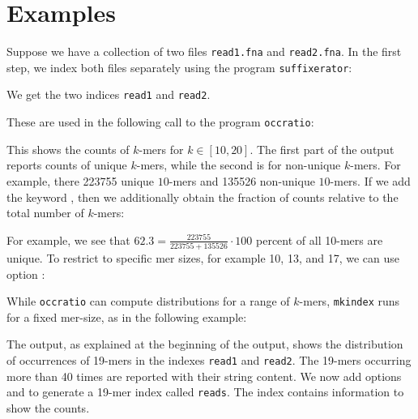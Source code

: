 \documentclass[12pt]{article}
\newcommand{\Programname}[1]{\texttt{\small #1}}
\newcommand{\TYmkindex}[0]{\Programname{mkindex}\xspace}
\newcommand{\TYoccratio}[0]{\Programname{occratio}\xspace}
\newcommand{\SFX}[0]{\Programname{suffixerator}\xspace}
\begin{document}
\section{Examples}

Suppose we have a collection of two files \texttt{read1.fna} and
\texttt{read2.fna}. In the first step, we index 
both files separately using the program \SFX:



We get the two indices \texttt{read1} and \texttt{read2}.

These are used in the following call to the program \TYoccratio:


This shows the counts of $k$-mers for $k\in[10,20]$. The first part of the
output reports counts of unique $k$-mers, while the second is for
non-unique $k$-mers. For example, there 223755 unique $10$-mers 
and 135526 non-unique $10$-mers. If we add the keyword 
, then we additionally obtain the fraction
of counts relative to the total number of $k$-mers:


For example, we see that $62.3=\frac{223755}{223755+135526}\cdot 100$
percent of all 10-mers are unique. To restrict to specific mer sizes, for
example 10, 13, and 17, we can use option :


While \TYoccratio can compute distributions for a range of 
$k$-mers, \TYmkindex runs for a fixed mer-size, as in the following example:


The output, as explained at the beginning of the output, shows the
distribution of occurrences of 19-mers in the indexes
\texttt{read1} and \texttt{read2}. The 19-mers occurring more 
than 40 times are reported with their string content.
We now add options  and  to 
generate a 19-mer index called \texttt{reads}. The index contains
information to show the counts.
\end{document}
